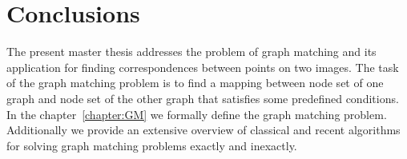 \chapter{Conclusions } \label{chapter:conclusions}
The present master thesis addresses the problem of graph matching and its application for finding correspondences between points on two images. The task of the graph matching problem is to find a mapping between node set of one graph and node set of the other graph that satisfies some predefined conditions. In the chapter~\ref{chapter:GM} we formally define the graph matching problem. 
Additionally we provide an extensive overview of classical and recent algorithms for solving graph matching problems exactly and inexactly. 


